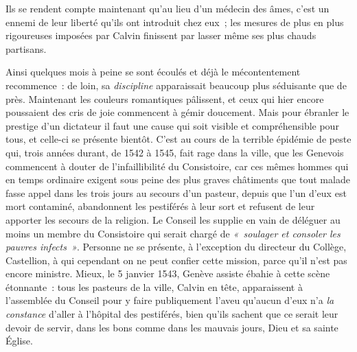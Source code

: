 \documentclass[french,twoside]{book} %
\begin{document}
\noindent Ils se rendent compte maintenant qu’au lieu d’un médecin des âmes, c’est un ennemi de leur liberté qu’ils ont introduit chez eux ; les mesures de plus en plus rigoureuses imposées par Calvin finissent par lasser même ses plus chauds partisans.\par
Ainsi quelques mois à peine se sont écoulés et déjà le mécontentement recommence : de loin, sa \emph{discipline} apparaissait beaucoup plus séduisante que de près. Maintenant les couleurs romantiques pâlissent, et ceux qui hier encore poussaient des cris de joie commencent à gémir doucement. Mais pour ébranler le prestige d’un dictateur il faut une cause qui soit visible et compréhensible pour tous, et celle-ci se présente bientôt. C’est au cours de la terrible épidémie de peste qui, trois années durant, de 1542 à 1545, fait rage dans la ville, que les Genevois commencent à douter de l’infaillibilité du Consistoire, car ces mêmes hommes qui en temps ordinaire exigent sous peine des plus graves châtiments que tout malade fasse appel dans les trois jours au secours d’un pasteur, depuis que l’un d’eux est mort contaminé, abandonnent les pestiférés à leur sort et refusent de leur apporter les secours de la religion. Le Conseil les supplie en vain de déléguer au moins un membre du Consistoire qui serait chargé de \emph{« soulager et consoler les pauvres infects »}. Personne ne se présente, à l’exception du directeur du Collège, Castellion, à qui cependant on ne peut confier cette mission, parce qu’il n’est pas encore ministre. Mieux, le 5 janvier 1543, Genève assiste ébahie à cette scène étonnante : tous les pasteurs de la ville, Calvin en tête, apparaissent à l’assemblée du Conseil pour y faire publiquement l’aveu qu’aucun d’eux n’a \emph{la constance} d’aller à l’hôpital des pestiférés, bien qu’ils sachent que ce serait leur devoir de servir, dans les bons comme dans les mauvais jours, Dieu et sa sainte Église.\par
\end{document}
